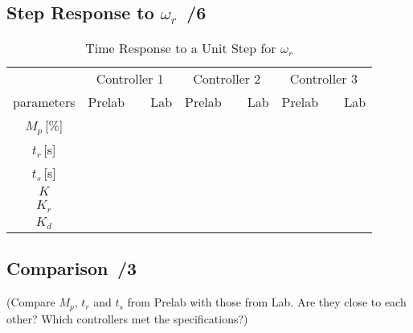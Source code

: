 \documentclass{article}
\newcommand{\score}{\hfill \underline{\hspace{0.65cm}}\,/} %
\begin{document}
\subsection{Step Response to $\omega_r$ \score 6}
\begin{table}[phtb]\footnotesize \label{tbl:lab3_q1}
\begin{center}
\caption{Time Response to a Unit Step for $\omega_r$}
\begin{tabular}{c|m{.85cm}|m{.85cm}|m{.85cm}|m{.85cm}|m{.85cm}|m{.85cm}} \hline \hline
\cellcolor{lightgray} & \multicolumn{2}{c|}{\cellcolor{lightgray}Controller 1} & \multicolumn{2}{c|}{\cellcolor{lightgray}Controller 2}  & \multicolumn{2}{c}{\cellcolor{lightgray}Controller 3}  \\ \cline{2-7}
\multirow{-2}{*}{\cellcolor{lightgray}parameters}& Prelab & ~~Lab & Prelab & ~~Lab & Prelab &~~Lab \\ \hline
$M_p$\,[\%] & & & & & & \\ \hline
$t_r$\,[s] & & & & & & \\ \hline
$t_s$\,[s] & & & & & & \\ \hline
$K$  &\multicolumn{2}{c|}{}&\multicolumn{2}{c|}{}&\multicolumn{2}{c}{} \\ \hline
$K_r$  &\multicolumn{2}{c|}{}&\multicolumn{2}{c|}{}&\multicolumn{2}{c}{} \\ \hline
$K_d$  &\multicolumn{2}{c|}{}&\multicolumn{2}{c|}{}&\multicolumn{2}{c}{} \\ \hline
\end{tabular}
\end{center}
\end{table}

\subsection{Comparison \score 3}
(Compare $M_p$, $t_r$ and $t_s$ from Prelab with those from Lab. Are they close to each other? Which controllers met the specifications?)
\end{document}
